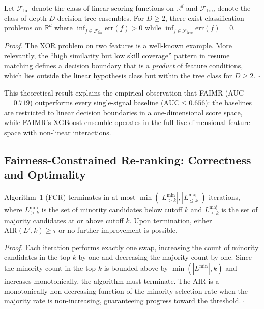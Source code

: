 \documentclass{svproc}
\begin{document}
\begin{theorem}\label{thm:express}
Let $\mathcal{F}_\text{lin}$ denote the class of linear scoring functions on $\mathbb{R}^d$ and $\mathcal{F}_\text{tree}$ denote the class of depth-$D$ decision tree ensembles. For $D \geq 2$, there exist classification problems on $\mathbb{R}^d$ where $\inf_{f \in \mathcal{F}_\text{lin}} \text{err}(f) > 0$ while $\inf_{f \in \mathcal{F}_\text{tree}} \text{err}(f) = 0$.
\end{theorem}

\textit{Proof.} The XOR problem on two features is a well-known example. More relevantly, the ``high similarity but low skill coverage'' pattern in resume matching defines a decision boundary that is a \textit{product} of feature conditions, which lies outside the linear hypothesis class but within the tree class for $D \geq 2$. \hfill $\square$

This theoretical result explains the empirical observation that FAIMR (AUC~$= 0.719$) outperforms every single-signal baseline ($\text{AUC} \leq 0.656$): the baselines are restricted to linear decision boundaries in a one-dimensional score space, while FAIMR's XGBoost ensemble operates in the full five-dimensional feature space with non-linear interactions.

\subsection{Fairness-Constrained Re-ranking: Correctness and Optimality}\label{sec:fcr_theory}

\begin{theorem}\label{thm:fcr}
Algorithm~1 (FCR) terminates in at most $\min(|L_{>\!k}^{\text{min}}|, |L_{\leq k}^{\text{maj}}|)$ iterations, where $L_{>\!k}^{\text{min}}$ is the set of minority candidates below cutoff $k$ and $L_{\leq k}^{\text{maj}}$ is the set of majority candidates at or above cutoff $k$. Upon termination, either $\mathrm{AIR}(L', k) \geq \tau$ or no further improvement is possible.
\end{theorem}

\textit{Proof.} Each iteration performs exactly one swap, increasing the count of minority candidates in the top-$k$ by one and decreasing the majority count by one. Since the minority count in the top-$k$ is bounded above by $\min(|L^{\text{min}}|, k)$ and increases monotonically, the algorithm must terminate. The AIR is a monotonically non-decreasing function of the minority selection rate when the majority rate is non-increasing, guaranteeing progress toward the threshold. \hfill $\square$
\end{document}
